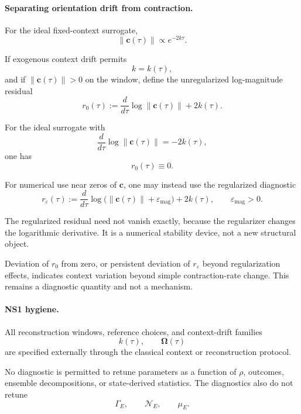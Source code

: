 \documentclass[aps,prx,onecolumn,11pt]{revtex4-2}
\theoremstyle{plain}
\theoremstyle{definition}
\theoremstyle{remark}
\begin{document}
\paragraph{Separating orientation drift from contraction.}

For the ideal fixed-context surrogate,
\[
\|\mathbf c(\tau)\|
\propto
e^{-2k\tau}.
\]

If exogenous context drift permits
\[
k=k(\tau),
\]
and if \(\|\mathbf c(\tau)\|>0\) on the window, define the unregularized
log-magnitude residual
\begin{equation}
r_0(\tau)
:=
\frac{d}{d\tau}
\log
\|\mathbf c(\tau)\|
+
2k(\tau).
\label{eq:toy_axis_mag_residual_unregularized}
\end{equation}

For the ideal surrogate with
\[
\frac{d}{d\tau}\log\|\mathbf c(\tau)\|
=
-2k(\tau),
\]
one has
\[
r_0(\tau)\equiv 0.
\]

For numerical use near zeros of \(\mathbf c\), one may instead use the
regularized diagnostic
\begin{equation}
r_{\varepsilon}(\tau)
:=
\frac{d}{d\tau}
\log
\bigl(
\|\mathbf c(\tau)\|
+
\varepsilon_{\mathrm{mag}}
\bigr)
+
2k(\tau),
\qquad
\varepsilon_{\mathrm{mag}}>0.
\label{eq:toy_axis_mag_residual}
\end{equation}

The regularized residual need not vanish exactly, because the
regularizer changes the logarithmic derivative. It is a numerical
stability device, not a new structural object.

Deviation of \(r_0\) from zero, or persistent deviation of
\(r_{\varepsilon}\) beyond regularization effects, indicates context
variation beyond simple contraction-rate change. This remains a
diagnostic quantity and not a mechanism.

\paragraph{NS1 hygiene.}

All reconstruction windows, reference choices, and context-drift
families
\[
k(\tau),
\qquad
\boldsymbol{\Omega}(\tau)
\]
are specified externally through the classical context or reconstruction
protocol.

No diagnostic is permitted to retune parameters as a function of
\(\rho\), outcomes, ensemble decompositions, or state-derived
statistics. The diagnostics also do not retune
\[
\Gamma_E,
\qquad
\mathcal N_E,
\qquad
\mu_E.
\]
\end{document}
